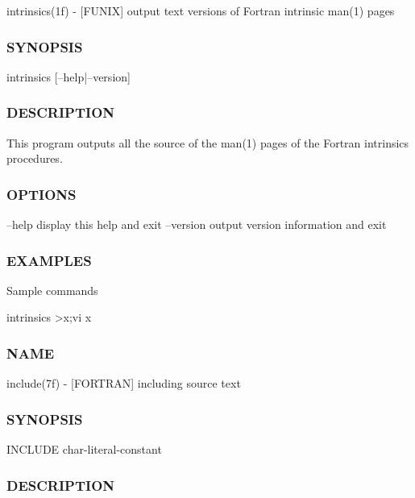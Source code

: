intrinsics(1f) -\/ \mbox{[}F\+U\+N\+IX\mbox{]} output text versions of Fortran intrinsic man(1) pages 

\subsubsection*{S\+Y\+N\+O\+P\+S\+IS}

\begin{DoxyVerb} intrinsics [--help|--version]
\end{DoxyVerb}


\subsubsection*{D\+E\+S\+C\+R\+I\+P\+T\+I\+ON}

This program outputs all the source of the man(1) pages of the Fortran intrinsics procedures.

\subsubsection*{O\+P\+T\+I\+O\+NS}

--help display this help and exit --version output version information and exit

\subsubsection*{E\+X\+A\+M\+P\+L\+ES}

\begin{DoxyVerb} Sample commands

    intrinsics >x;vi x \end{DoxyVerb}


\subsubsection*{N\+A\+ME}

include(7f) -\/ \mbox{[}F\+O\+R\+T\+R\+AN\mbox{]} including source text \subsubsection*{S\+Y\+N\+O\+P\+S\+IS}

\begin{DoxyVerb} INCLUDE char-literal-constant
\end{DoxyVerb}
 \subsubsection*{D\+E\+S\+C\+R\+I\+P\+T\+I\+ON}

